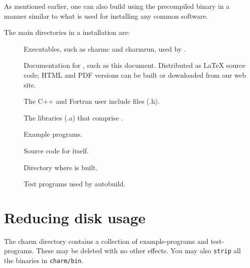 As mentioned earlier, one can also build \charmpp{} using the precompiled binary
in a manner similar to what is used for installing any common software.


The main directories in a \charmpp{} installation are:

\begin{description}
\item[]
Executables, such as charmc and charmrun,
used by \charmpp{}.

\item[]
Documentation for \charmpp{}, such as this
document.  Distributed as LaTeX source code; HTML and PDF versions
can be built or downloaded from our web site.

\item[]
The \charmpp{} C++ and Fortran user include files (.h).

\item[]
The libraries (.a) that comprise \charmpp{}.

\item[]
Example \charmpp{} programs.

\item[]
Source code for \charmpp{} itself.

\item[]
Directory where \charmpp{} is built.


\item[]
Test \charmpp{} programs used by autobuild.

\end{description}

\section{Reducing disk usage}

The charm directory contains a collection of example-programs and
test-programs.  These may be deleted with no other effects. You may 
also {\tt strip} all the binaries in {\tt charm/bin}.





